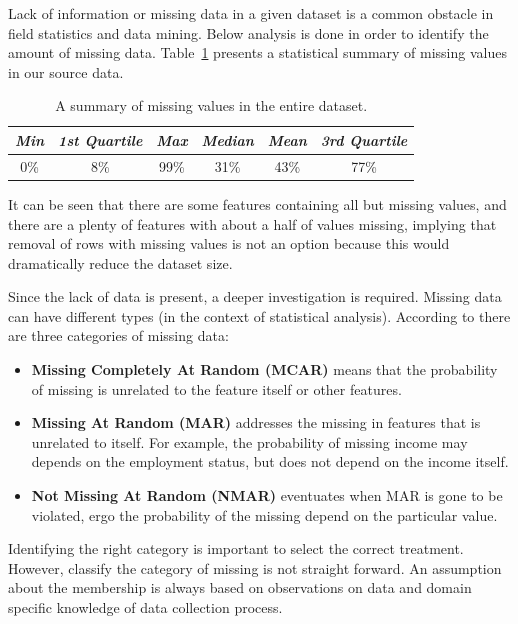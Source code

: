 Lack of information or missing data in a given dataset is a common obstacle in field statistics and data mining. Below analysis is done in order to identify the amount of missing data. Table~\ref{tab:missings-over-all} presents a statistical summary of missing values in our source data.
 \begin{table}[ht!]
  \begin{center}
    \caption{A summary of missing values in the entire dataset.}
    \label{tab:missings-over-all}
    \begin{tabular}{|c|c|c|c|c|c|}\hline
    \textit{Min} & \textit{1st Quartile} & \textit{Max} & \textit{Median} & \textit{Mean} & \textit{3rd Quartile} \\
      \hline
     0\% & 8\% & 99\% & 31\% & 43\% & 77\% \\ 
     \hline 
    \end{tabular}
  \end{center}
\end{table}

It can be seen that there are some features containing all but missing values, and there are a plenty of features with about a half of values missing, implying that removal of rows with missing values is not an option because this would dramatically reduce the dataset size.

Since the lack of data is present, a deeper investigation is required. Missing data can have different types (in the context of statistical analysis). According to \cite{Allison:2007} there are three categories of missing data:

 \begin{itemize}
    \item \textbf{Missing Completely At Random (MCAR)} means that the probability of missing is unrelated to the feature itself or other features. 
    \item \textbf{Missing At Random (MAR)} addresses the missing in features that is unrelated to itself. For example, the probability of missing income may depends on the employment status, but does not depend on the income itself.
    \item \textbf{Not Missing At Random (NMAR)} eventuates when MAR is gone to be violated, ergo the probability of the missing depend on the particular value.
 \end{itemize}

Identifying the right category is important to select the correct treatment. However, classify the category of missing is not straight forward. An assumption about the membership is always based on observations on data and domain specific knowledge of data collection process.

